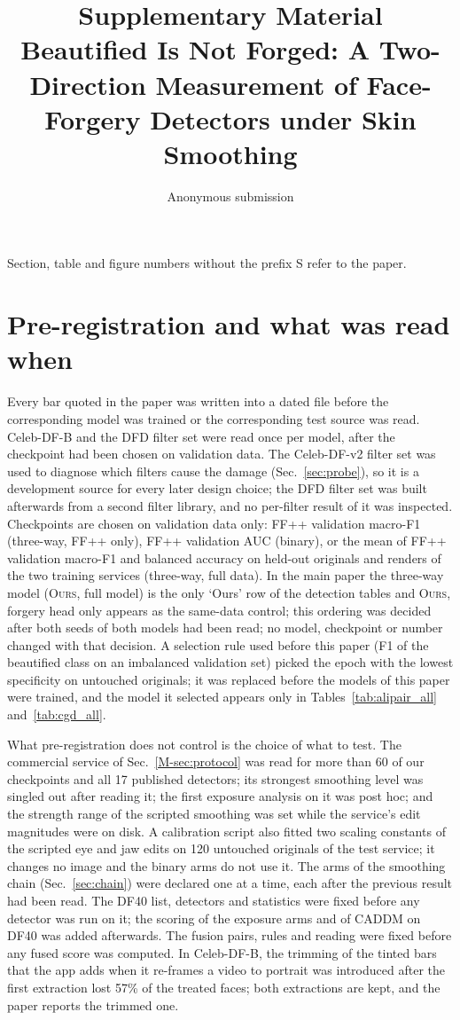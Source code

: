 \documentclass[10pt]{article}
\title{Supplementary Material\\Beautified Is Not Forged: A Two-Direction Measurement of Face-Forgery Detectors under Skin Smoothing}
\author{Anonymous submission}\date{}
\newcommand{\oursB}{\textsc{Ours}, forgery head only}
\newcommand{\oursF}{\textsc{Ours}, full model}
\begin{document}
\maketitle
Section, table and figure numbers without the prefix S refer to the paper.

\section{Pre-registration and what was read when}
\label{sec:prereg}
Every bar quoted in the paper was written into a dated file before the corresponding model was trained or the corresponding test
source was read. Celeb-DF-B and the DFD filter set were read once per model, after the checkpoint had been chosen on validation
data. The Celeb-DF-v2 filter set was used to diagnose which filters cause the damage (Sec.~\ref{sec:probe}), so it is a
development source for every later design choice; the DFD filter set was built afterwards from a second filter library, and no
per-filter result of it was inspected. Checkpoints are chosen on validation data only: FF++ validation macro-F1 (three-way, FF++
only), FF++ validation AUC (binary), or the mean of FF++ validation macro-F1 and balanced accuracy on held-out originals and
renders of the two training services (three-way, full data). In the main paper the three-way model
(\oursF{}) is the only `Ours' row of the detection tables and \oursB{} appears as the same-data control; this ordering was
decided after both seeds of both models had been read; no model, checkpoint or number changed with that decision. A selection rule used before this paper (F1 of the beautified class
on an imbalanced validation set) picked the epoch with the lowest specificity on untouched originals; it was replaced before the
models of this paper were trained, and the model it selected appears only in Tables~\ref{tab:alipair_all} and~\ref{tab:cgd_all}.

What pre-registration does not control is the choice of what to test. The commercial service of Sec.~\ref{M-sec:protocol} was
read for more than 60 of our checkpoints and all 17 published detectors; its strongest smoothing level was singled out after
reading it; the first exposure analysis on it was post hoc; and the strength range of the scripted smoothing was set while the
service's edit magnitudes were on disk. A calibration script also fitted two scaling constants of the scripted eye and jaw edits on 120
untouched originals of the test service; it changes no image and the binary arms do not use it. The arms of the smoothing chain (Sec.~\ref{sec:chain}) were declared one at a time, each
after the previous result had been read. The DF40 list, detectors and statistics were fixed before any detector was run on it;
the scoring of the exposure arms and of CADDM on DF40 was added afterwards. The fusion pairs, rules and reading were fixed before
any fused score was computed. In Celeb-DF-B, the trimming of the tinted bars that the app adds when it re-frames a video to
portrait was introduced after the first extraction lost 57\% of the treated faces; both extractions are kept, and the paper
reports the trimmed one.
\end{document}
